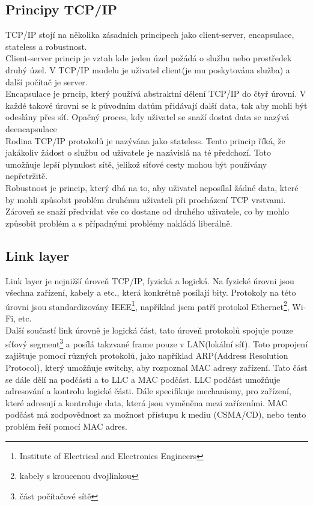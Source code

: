 \documentclass[12pt]{article}
\begin{document}
\subsection{Principy TCP/IP}
TCP/IP stojí na několika zásadních principech jako client-server, encapsulace, stateless a robustnost. 
\\
Client-server princip je vztah kde jeden úzel požádá o službu nebo
 prostředek druhý úzel. V TCP/IP modelu je uživatel  client(je mu poskytována služba) a další počítač je server. 
\\
Encapsulace je prncip, který používá abstraktní dělení TCP/IP do čtyř úrovní. V každé takové úrovni se k původním datům přidávají další data, tak aby mohli být odeslány přes síť. Opačný proces, kdy uživatel se snaží dostat data se nazývá deencapsulace 
\\
Rodina TCP/IP protokolů je nazývána jako stateless. Tento princip říká, že jakákoliv žádost o službu od uživatele je nazávislá na té předchozí. Toto umožňuje lepší plynulost sítě, jelikož síťové cesty mohou být používány nepřetržitě.
\\
Robustnost je princip, který dbá na to, aby uživatel neposílal žádné data, které by mohli způsobit problém druhému uživateli při procházení TCP vrstvami. Zároveň se snaží předvídat vše co dostane od druhého uživatele, co by mohlo způsobit problém a s případnými problémy nakládá liberálně.

\subsection{Link layer}
Link layer je nejnižší úroveň TCP/IP, fyzická a logická. Na fyzické úrovni jsou všechna zařízení, kabely a etc., která konkrétně posílají bity. Protokoly na této úrovni jsou standardizovány IEEE\footnote{Institute of Electrical and Electronics Engineers}, například jsem patří protokol Ethernet\footnote{kabely s kroucenou dvojlinkou}, Wi-Fi, etc.
 \\
Další součastí link úrovně je logická část, tato úroveň protokolů spojuje pouze síťový segment\footnote{část počítačové sítě} a posílá takzvané frame pouze v LAN(lokální síť). Toto propojení zajištuje pomocí různých protokolů, jako například ARP(Address Resolution Protocol), který umožňuje switchy, aby rozpoznal MAC adresy zařízení. Tato část se dále dělí na podčásti a to LLC a MAC podčást. LLC podčást umožňuje adresování a kontrolu logické části. Dále specifikuje mechanismy, pro zařízení, které adresují a kontroluje data, která jsou vyměněna mezi zařízeními. MAC podčást má zodpovědnost za možnost přístupu k mediu (CSMA/CD), nebo tento problém řeší pomocí MAC adres. 
\end{document}
